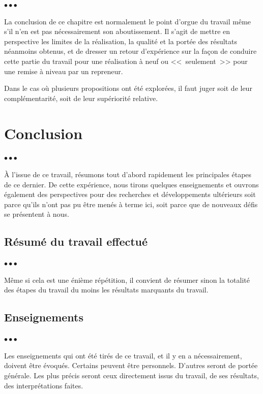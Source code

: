 \documentclass[11pt, french, screen, research-development]{report-rd-info}
\newenvironment{explanation}
{\color{blue}
 \begin{list}{}{\hspace{0.2\textwidth}\color{blue}}\item $\bullet\bullet\bullet$
}
{\end{list}}
\begin{document}
\begin{explanation}
   La conclusion de ce chapitre est normalement le point d'orgue du travail même s'il n'en est pas nécessairement son aboutissement.
   Il s'agit de mettre en perspective les limites de la réalisation, la qualité et la portée des résultats néanmoins obtenus, et de dresser un retour d'expérience sur la façon de conduire cette partie du travail pour une réalisation à neuf ou <<~seulement~>> pour une remise à niveau par un repreneur.

   Dans le cas où plusieurs propositions ont été explorées, il faut juger soit de leur complémentarité, soit de leur supériorité relative.
\end{explanation}


\chapter{Conclusion}

\begin{explanation}
   À l'issue de ce travail, résumons tout d'abord rapidement les principales étapes de ce dernier.
   De cette expérience, nous tirons quelques enseignements et ouvrons également des perspectives pour des recherches et développements ultérieurs soit parce qu'ils n'ont pas pu être menés à terme ici, soit parce que de nouveaux défis se présentent à nous.
\end{explanation}

\section{Résumé du travail effectué}

\begin{explanation}
   Même si cela est une énième répétition, il convient de résumer sinon la totalité des étapes du travail du moins les résultats marquants du travail.
\end{explanation}

\section{Enseignements}

\begin{explanation}
   Les enseignements qui ont été tirés de ce travail, et il y en a nécessairement, doivent être évoqués.
   Certains peuvent être personnels.
   D'autres seront de portée générale.
   Les plus précis seront ceux directement issus du travail, de ses résultats, des interprétations faites.
\end{explanation}
\end{document}
